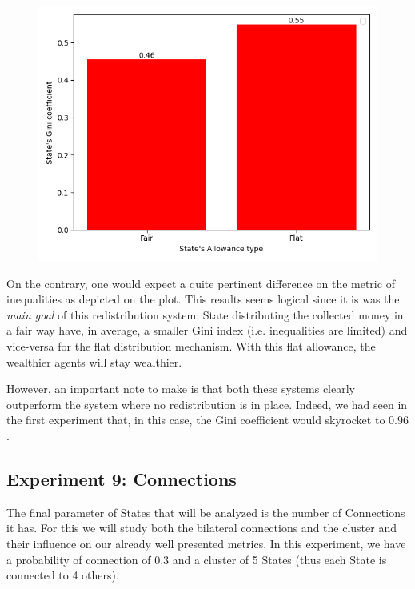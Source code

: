 {{{{{{{        \begin{figure}
            \includegraphics[width=\linewidth]{img/exp/8_3.png}
        \end{figure} 
        { On the contrary, one would expect a quite pertinent difference on the metric of inequalities as depicted on the plot. This results seems logical since it is was the \emph{main goal} of this redistribution system: State distributing the collected money in a fair way have, in average, a smaller Gini index (i.e. inequalities are limited) and vice-versa for the flat distribution mechanism. With this flat allowance, the wealthier agents will stay wealthier.

        However, an important note to make is that both these systems clearly outperform the system where no redistribution is in place. Indeed, we had seen in the first experiment that, in this case, the Gini coefficient would skyrocket to $0.96$.
        \par



    \subsection{Experiment 9: Connections}
    The final parameter of States that will be analyzed is the number of Connections it has. For this we will study both the bilateral connections and the cluster and their influence on our already well presented metrics. In this experiment, we have a probability of connection of 0.3 and a cluster of 5 States (thus each State is connected to 4 others).

}}}}}}}}
